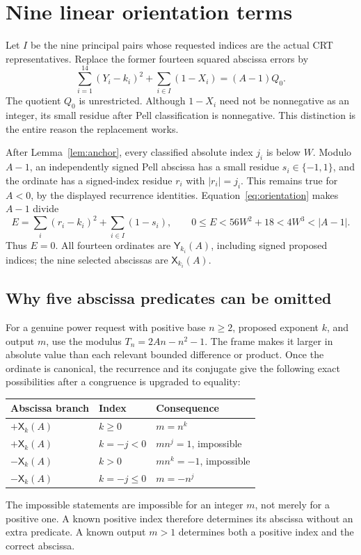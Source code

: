 \documentclass[11pt,letterpaper]{article}
\theoremstyle{definition}\newtheorem{definition}[theorem]{Definition}
\theoremstyle{remark}\newtheorem{remark}[theorem]{Remark}
\newcommand{\X}{\mathsf X}
\newcommand{\Y}{\mathsf Y}
\begin{document}
\section{Nine linear orientation terms}\label{sec:orientation}

Let \(I\) be the nine principal pairs whose requested indices are the actual CRT representatives. Replace the former fourteen squared abscissa errors by
\begin{equation}\label{eq:orientation}
 \boxed{\sum_{i=1}^{14}(Y_i-k_i)^2+
              \sum_{i\in I}(1-X_i)=(A-1)Q_0.}
\end{equation}
The quotient \(Q_0\) is unrestricted. Although \(1-X_i\) need not be nonnegative as an integer, its small residue after Pell classification is nonnegative. This distinction is the entire reason the replacement works.

After Lemma~\ref{lem:anchor}, every classified absolute index \(j_i\) is below \(W\). Modulo \(A-1\), an independently signed Pell abscissa has a small residue \(s_i\in\{-1,1\}\), and the ordinate has a signed-index residue \(r_i\) with \(|r_i|=j_i\). This remains true for \(A<0\), by the displayed recurrence identities. Equation~\eqref{eq:orientation} makes \(A-1\) divide
\[
 E=\sum_i(r_i-k_i)^2+\sum_{i\in I}(1-s_i),\qquad
 0\le E<56W^2+18<4W^3<|A-1|.
\]
Thus \(E=0\). All fourteen ordinates are \(\Y_{k_i}(A)\), including signed proposed indices; the nine selected abscissas are \(\X_{k_i}(A)\).

\subsection{Why five abscissa predicates can be omitted}
For a genuine power request with positive base \(n\ge2\), proposed exponent \(k\), and output \(m\), use the modulus
\(T_n=2An-n^2-1\). The frame makes it larger in absolute value than each relevant bounded difference or product. Once the ordinate is canonical, the recurrence and its conjugate give the following exact possibilities after a congruence is upgraded to equality:
\begin{center}
\begin{tabular}{lll}
\toprule
Abscissa branch & Index & Consequence\\
\midrule
\(+\X_k(A)\)&\(k\ge0\)&\(m=n^k\)\\
\(+\X_k(A)\)&\(k=-j<0\)&\(mn^j=1\), impossible\\
\(-\X_k(A)\)&\(k>0\)&\(mn^k=-1\), impossible\\
\(-\X_k(A)\)&\(k=-j\le0\)&\(m=-n^j\)\\
\bottomrule
\end{tabular}
\end{center}
The impossible statements are impossible for an integer \(m\), not merely for a positive one. A known positive index therefore determines its abscissa without an extra predicate. A known output \(m>1\) determines both a positive index and the correct abscissa.
\end{document}
